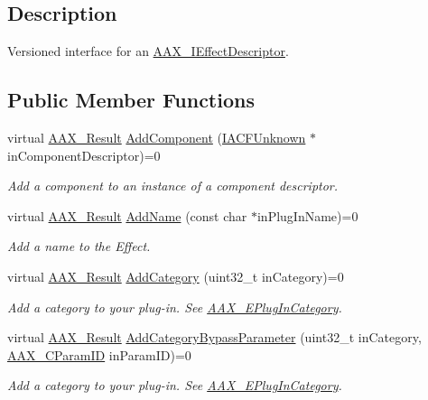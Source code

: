\subsection{Description}
Versioned interface for an \hyperlink{a00096}{A\+A\+X\+\_\+\+I\+Effect\+Descriptor}. \subsection*{Public Member Functions}
\begin{DoxyCompactItemize}
\item 
virtual \hyperlink{a00149_a4d8f69a697df7f70c3a8e9b8ee130d2f}{A\+A\+X\+\_\+\+Result} \hyperlink{a00057_a9e2eabbcaa46ada4b5f9bab2663f8a9f}{Add\+Component} (\hyperlink{a00146}{I\+A\+C\+F\+Unknown} $\ast$in\+Component\+Descriptor)=0
\begin{DoxyCompactList}\small\item\em Add a component to an instance of a component descriptor. \end{DoxyCompactList}\item 
virtual \hyperlink{a00149_a4d8f69a697df7f70c3a8e9b8ee130d2f}{A\+A\+X\+\_\+\+Result} \hyperlink{a00057_a931fdad618c2e12c1e921dca5b3c6f56}{Add\+Name} (const char $\ast$in\+Plug\+In\+Name)=0
\begin{DoxyCompactList}\small\item\em Add a name to the Effect. \end{DoxyCompactList}\item 
virtual \hyperlink{a00149_a4d8f69a697df7f70c3a8e9b8ee130d2f}{A\+A\+X\+\_\+\+Result} \hyperlink{a00057_a415d749d8a464a56543733c5270a018c}{Add\+Category} (uint32\+\_\+t in\+Category)=0
\begin{DoxyCompactList}\small\item\em Add a category to your plug-\/in. See \hyperlink{a00206_aef9637518fb1ac0e2f403444c73aba4a}{A\+A\+X\+\_\+\+E\+Plug\+In\+Category}. \end{DoxyCompactList}\item 
virtual \hyperlink{a00149_a4d8f69a697df7f70c3a8e9b8ee130d2f}{A\+A\+X\+\_\+\+Result} \hyperlink{a00057_af2f7f299d6012675960263812e7b31aa}{Add\+Category\+Bypass\+Parameter} (uint32\+\_\+t in\+Category, \hyperlink{a00149_a1440c756fe5cb158b78193b2fc1780d1}{A\+A\+X\+\_\+\+C\+Param\+I\+D} in\+Param\+I\+D)=0
\begin{DoxyCompactList}\small\item\em Add a category to your plug-\/in. See \hyperlink{a00206_aef9637518fb1ac0e2f403444c73aba4a}{A\+A\+X\+\_\+\+E\+Plug\+In\+Category}. \end{DoxyCompactList}\item 

\end{DoxyCompactItemize}
